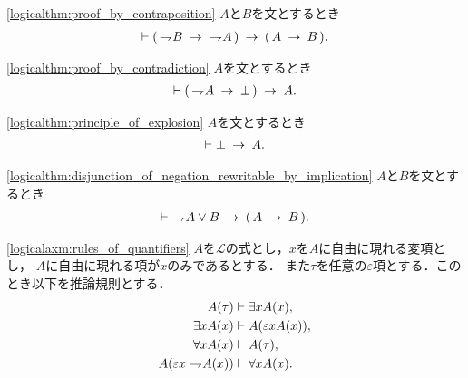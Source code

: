 	\begin{screen}
		\begin{logicalthm}[対偶論法の原理]
		\ref{logicalthm:proof_by_contraposition}
			$A$と$B$を文とするとき
			\begin{align}
				\vdash (\, \rightharpoondown\hspace{-0.25em} B \hspace{0.25em}\rightarrow\hspace{0.25em}\ \rightharpoondown\hspace{-0.25em} A\, )
				\hspace{0.25em}\rightarrow\hspace{0.25em} (\, A \hspace{0.25em}\rightarrow\hspace{0.25em} B\, ).
			\end{align}
		\end{logicalthm}
	\end{screen}
	
	\begin{screen}
		\begin{logicalthm}[背理法の原理]
		\ref{logicalthm:proof_by_contradiction}
			$A$を文とするとき
			\begin{align}
				\vdash (\, \rightharpoondown\hspace{-0.25em} A \hspace{0.25em}\rightarrow\hspace{0.25em} \bot\, ) \hspace{0.25em}\rightarrow\hspace{0.25em} A.
			\end{align}
		\end{logicalthm}
	\end{screen}
	
	\begin{screen}
		\begin{logicalthm}[爆発律]
		\ref{logicalthm:principle_of_explosion}
			$A$を文とするとき
			\begin{align}
				\vdash \bot \hspace{0.25em}\rightarrow\hspace{0.25em} A.
			\end{align}
		\end{logicalthm}
	\end{screen}
	
	\begin{screen}
		\begin{logicalthm}[否定の論理和は含意で書ける]
		\ref{logicalthm:disjunction_of_negation_rewritable_by_implication}
			$A$と$B$を文とするとき
			\begin{align}
				\vdash\ \rightharpoondown\hspace{-0.25em} A \vee B \hspace{0.25em}\rightarrow\hspace{0.25em} (\, A \hspace{0.25em}\rightarrow\hspace{0.25em} B\, ).
			\end{align}
		\end{logicalthm}
	\end{screen}
	
	\begin{screen}
		\begin{logicalaxm}[量化記号に関する規則]
		\ref{logicalaxm:rules_of_quantifiers}
			$A$を$\mathcal{L}$の式とし，$x$を$A$に自由に現れる変項とし，
			$A$に自由に現れる項が$x$のみであるとする．
			また$\tau$を任意の$\varepsilon$項とする．このとき以下を推論規則とする．
			\begin{align}
				A(\tau) &\vdash \exists x A(x), \\
				\exists x A(x) &\vdash A(\varepsilon x A(x)), \\
				\forall x A(x) &\vdash A(\tau), \\
				A(\varepsilon x \rightharpoondown\hspace{-0.25em} A(x)) &\vdash \forall x A(x).
			\end{align}
		\end{logicalaxm}
	\end{screen}
	
